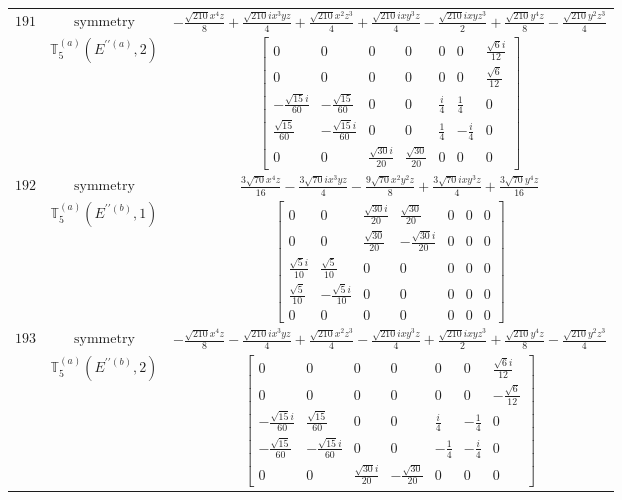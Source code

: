 \documentclass[fleqn,8pt,landscape]{jsarticle}
\begin{document}
\begin{longtable}{ccc}
$ 191 $ & $ \text{symmetry} $ & $ - \frac{\sqrt{210} x^{4} z}{8} + \frac{\sqrt{210} i x^{3} y z}{4} + \frac{\sqrt{210} x^{2} z^{3}}{4} + \frac{\sqrt{210} i x y^{3} z}{4} - \frac{\sqrt{210} i x y z^{3}}{2} + \frac{\sqrt{210} y^{4} z}{8} - \frac{\sqrt{210} y^{2} z^{3}}{4} $ \\
$  $ & $ \mathbb{T}_{5}^{(a)}(E^{\prime\prime(a)},2) $ & $ \begin{bmatrix} 0 & 0 & 0 & 0 & 0 & 0 & \frac{\sqrt{6} i}{12} \\ 0 & 0 & 0 & 0 & 0 & 0 & \frac{\sqrt{6}}{12} \\ - \frac{\sqrt{15} i}{60} & - \frac{\sqrt{15}}{60} & 0 & 0 & \frac{i}{4} & \frac{1}{4} & 0 \\ \frac{\sqrt{15}}{60} & - \frac{\sqrt{15} i}{60} & 0 & 0 & \frac{1}{4} & - \frac{i}{4} & 0 \\ 0 & 0 & \frac{\sqrt{30} i}{20} & \frac{\sqrt{30}}{20} & 0 & 0 & 0 \end{bmatrix} $ \\ \hline
$ 192 $ & $ \text{symmetry} $ & $ \frac{3 \sqrt{70} x^{4} z}{16} - \frac{3 \sqrt{70} i x^{3} y z}{4} - \frac{9 \sqrt{70} x^{2} y^{2} z}{8} + \frac{3 \sqrt{70} i x y^{3} z}{4} + \frac{3 \sqrt{70} y^{4} z}{16} $ \\
$  $ & $ \mathbb{T}_{5}^{(a)}(E^{\prime\prime(b)},1) $ & $ \begin{bmatrix} 0 & 0 & \frac{\sqrt{30} i}{20} & \frac{\sqrt{30}}{20} & 0 & 0 & 0 \\ 0 & 0 & \frac{\sqrt{30}}{20} & - \frac{\sqrt{30} i}{20} & 0 & 0 & 0 \\ \frac{\sqrt{5} i}{10} & \frac{\sqrt{5}}{10} & 0 & 0 & 0 & 0 & 0 \\ \frac{\sqrt{5}}{10} & - \frac{\sqrt{5} i}{10} & 0 & 0 & 0 & 0 & 0 \\ 0 & 0 & 0 & 0 & 0 & 0 & 0 \end{bmatrix} $ \\ \hline
$ 193 $ & $ \text{symmetry} $ & $ - \frac{\sqrt{210} x^{4} z}{8} - \frac{\sqrt{210} i x^{3} y z}{4} + \frac{\sqrt{210} x^{2} z^{3}}{4} - \frac{\sqrt{210} i x y^{3} z}{4} + \frac{\sqrt{210} i x y z^{3}}{2} + \frac{\sqrt{210} y^{4} z}{8} - \frac{\sqrt{210} y^{2} z^{3}}{4} $ \\
$  $ & $ \mathbb{T}_{5}^{(a)}(E^{\prime\prime(b)},2) $ & $ \begin{bmatrix} 0 & 0 & 0 & 0 & 0 & 0 & \frac{\sqrt{6} i}{12} \\ 0 & 0 & 0 & 0 & 0 & 0 & - \frac{\sqrt{6}}{12} \\ - \frac{\sqrt{15} i}{60} & \frac{\sqrt{15}}{60} & 0 & 0 & \frac{i}{4} & - \frac{1}{4} & 0 \\ - \frac{\sqrt{15}}{60} & - \frac{\sqrt{15} i}{60} & 0 & 0 & - \frac{1}{4} & - \frac{i}{4} & 0 \\ 0 & 0 & \frac{\sqrt{30} i}{20} & - \frac{\sqrt{30}}{20} & 0 & 0 & 0 \end{bmatrix} $ \\ \hline

\end{longtable}
\end{document}
